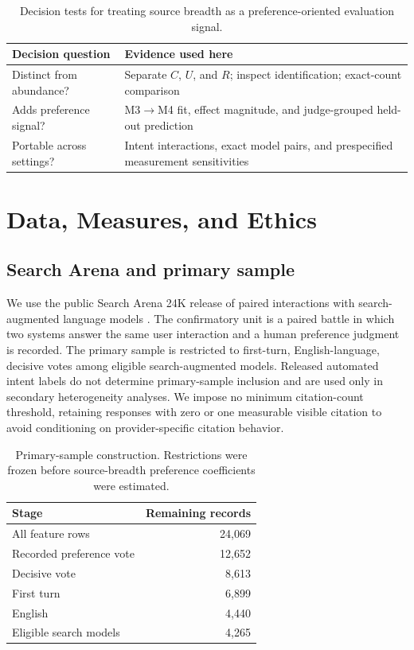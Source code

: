 \documentclass[sigconf,natbib=true,anonymous=true]{acmart}
\begin{document}
\begin{table}[t]
\centering
\caption{Decision tests for treating source breadth as a preference-oriented evaluation signal.}
\label{tab:validity}
\small
\begin{tabular}{p{}p{}}
\toprule
Decision question & Evidence used here \\
\midrule
Distinct from abundance? & Separate $C$, $U$, and $R$; inspect identification; exact-count comparison \\
Adds preference signal? & M3$\rightarrow$M4 fit, effect magnitude, and judge-grouped held-out prediction \\
Portable across settings? & Intent interactions, exact model pairs, and prespecified measurement sensitivities \\
\bottomrule
\end{tabular}
\end{table}

\section{Data, Measures, and Ethics}
\subsection{Search Arena and primary sample}
We use the public Search Arena 24K release of paired interactions with search-augmented language models \citep{miroyan2026searcharena}. The confirmatory unit is a paired battle in which two systems answer the same user interaction and a human preference judgment is recorded. The primary sample is restricted to first-turn, English-language, decisive votes among eligible search-augmented models. Released automated intent labels do not determine primary-sample inclusion and are used only in secondary heterogeneity analyses. We impose no minimum citation-count threshold, retaining responses with zero or one measurable visible citation to avoid conditioning on provider-specific citation behavior.

\begin{table}[t]
\centering
\caption{Primary-sample construction. Restrictions were frozen before source-breadth preference coefficients were estimated.}
\label{tab:funnel}
\small
\begin{tabular}{lr}
\toprule
Stage & Remaining records \\
\midrule
All feature rows & 24,069 \\
Recorded preference vote & 12,652 \\
Decisive vote & 8,613 \\
First turn & 6,899 \\
English & 4,440 \\
Eligible search models & 4,265 \\
\bottomrule
\end{tabular}
\end{table}
\end{document}
